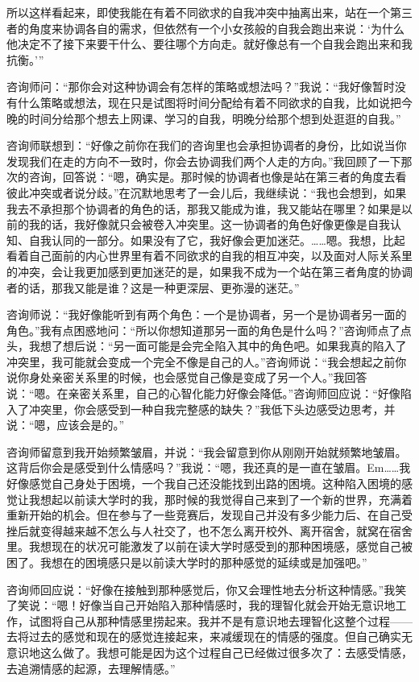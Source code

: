 所以这样看起来，即使我能在有着不同欲求的自我冲突中抽离出来，站在一个第三者的角度来协调各自的需求，但依然有一个小女孩般的自我会跑出来说：‘为什么他决定不了接下来要干什么、要往哪个方向走。就好像总有一个自我会跑出来和我抗衡。’”

咨询师问：“那你会对这种协调会有怎样的策略或想法吗？”我说：“我好像暂时没有什么策略或想法，现在只是试图将时间分配给有着不同欲求的自我，比如说把今晚的时间分给那个想去上网课、学习的自我，明晚分给那个想到处逛逛的自我。”

咨询师联想到：“好像之前你在我们的咨询里也会承担协调者的身份，比如说当你发现我们在走的方向不一致时，你会去协调我们两个人走的方向。”我回顾了一下那次的咨询，回答说：“嗯，确实是。那时候的协调者也像是站在第三者的角度去看彼此冲突或者说分歧。”在沉默地思考了一会儿后，我继续说：“我也会想到，如果我去不承担那个协调者的角色的话，那我又能成为谁，我又能站在哪里？如果是以前的我的话，我好像就只会被卷入冲突里。这一协调者的角色好像更像是自我认知、自我认同的一部分。如果没有了它，我好像会更加迷茫。……嗯。我想，比起看着自己面前的内心世界里有着不同欲求的自我的相互冲突，以及面对人际关系里的冲突，会让我更加感到更加迷茫的是，如果我不成为一个站在第三者角度的协调者的话，那我又能是谁？这是一种更深层、更弥漫的迷茫。”

咨询师说：“我好像能听到有两个角色：一个是协调者，另一个是协调者另一面的角色。”我有点困惑地问：“所以你想知道那另一面的角色是什么吗？”咨询师点了点头，我想了想后说：“另一面可能是会完全陷入其中的角色吧。如果我真的陷入了冲突里，我可能就会变成一个完全不像是自己的人。”咨询师说：“我会想起之前你说你身处亲密关系里的时候，也会感觉自己像是变成了另一个人。”我回答说：“嗯。在亲密关系里，自己的心智化能力好像会降低。”咨询师回应说：“好像陷入了冲突里，你会感受到一种自我完整感的缺失？”我低下头边感受边思考，并说：“嗯，应该会是的。”

咨询师留意到我开始频繁皱眉，并说：“我会留意到你从刚刚开始就频繁地皱眉。这背后你会是感受到什么情感吗？”我说：“嗯，我还真的是一直在皱眉。Em……我好像感觉自己身处于困境，一个我自己还没能找到出路的困境。这种陷入困境的感觉让我想起以前读大学时的我，那时候的我觉得自己来到了一个新的世界，充满着重新开始的机会。但在参与了一些竞赛后，发现自己并没有多少能力后、在自己受挫后就变得越来越不怎么与人社交了，也不怎么离开校外、离开宿舍，就窝在宿舍里。我想现在的状况可能激发了以前在读大学时感受到的那种困境感，感觉自己被困了。我想在的困境感只是以前读大学时的那种感觉的延续或是加强吧。”

咨询师回应说：“好像在接触到那种感觉后，你又会理性地去分析这种情感。”我笑了笑说：“嗯！好像当自己开始陷入那种情感时，我的理智化就会开始无意识地工作，试图将自己从那种情感里捞起来。我并不是有意识地去理智化这整个过程——去将过去的感觉和现在的感觉连接起来，来减缓现在的情感的强度。但自己确实无意识地这么做了。我想可能是因为这个过程自己已经做过很多次了：去感受情感，去追溯情感的起源，去理解情感。”


